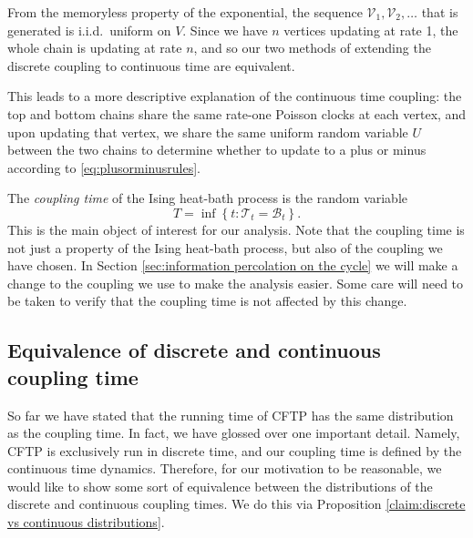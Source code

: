 	From the memoryless property of the exponential, the sequence $\mathcal{V}_1, \mathcal{V}_2, \dots$ that is generated is i.i.d.\ uniform on $V$. Since we have $n$ vertices updating at rate 1, the whole chain is updating at rate $n$, and so our two methods of extending the discrete coupling to continuous time are equivalent.

		
	

	



	This leads to a more descriptive explanation of the continuous time coupling: the top and bottom chains share the same rate-one Poisson clocks at each vertex, and upon updating that vertex, we share the same uniform random variable $U$ between the two chains to determine whether to update to a plus or minus according to \eqref{eq:plusorminusrules}.

	The \emph{coupling time} of the Ising heat-bath process is the random variable
	\begin{equation}
		T = \inf \left\{t : \mathscr{T}_t = \mathscr{B}_t \right\}.	
	\end{equation}
	This is the main object of interest for our analysis. Note that the coupling time is not just a property of the Ising heat-bath process, but also of the coupling we have chosen. In Section \ref{sec:information percolation on the cycle} we will make a change to the coupling we use to make the analysis easier. Some care will need to be taken to verify that the coupling time is not affected by this change.

	\subsection{Equivalence of discrete and continuous coupling time}
	So far we have stated that the running time of CFTP has the same distribution as the coupling time. In fact, we have glossed over one important detail. Namely, CFTP is exclusively run in discrete time, and our coupling time is defined by the continuous time dynamics. Therefore, for our motivation to be reasonable, we would like to show some sort of equivalence between the distributions of the discrete and continuous coupling times. We do this via Proposition \ref{claim:discrete vs continuous distributions}. 

